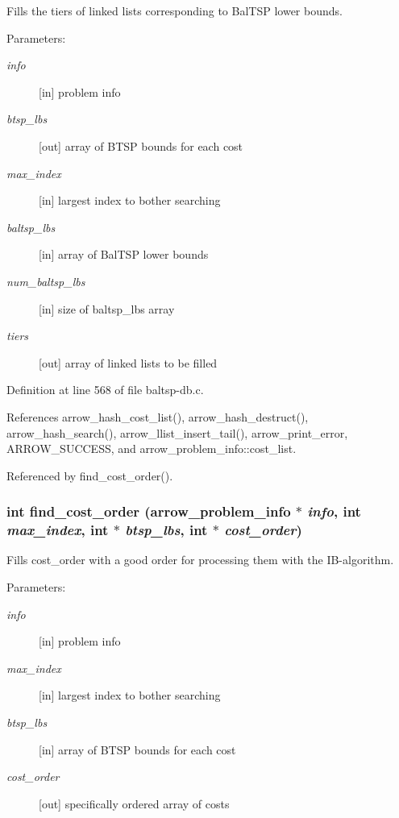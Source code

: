 Fills the tiers of linked lists corresponding to BalTSP lower bounds. 

\begin{Desc}
\item[Parameters:]
\begin{description}
\item[{\em info}]\mbox{[}in\mbox{]} problem info \item[{\em btsp\_\-lbs}]\mbox{[}out\mbox{]} array of BTSP bounds for each cost \item[{\em max\_\-index}]\mbox{[}in\mbox{]} largest index to bother searching \item[{\em baltsp\_\-lbs}]\mbox{[}in\mbox{]} array of BalTSP lower bounds \item[{\em num\_\-baltsp\_\-lbs}]\mbox{[}in\mbox{]} size of baltsp\_\-lbs array \item[{\em tiers}]\mbox{[}out\mbox{]} array of linked lists to be filled \end{description}
\end{Desc}


Definition at line 568 of file baltsp-db.c.

References arrow\_\-hash\_\-cost\_\-list(), arrow\_\-hash\_\-destruct(), arrow\_\-hash\_\-search(), arrow\_\-llist\_\-insert\_\-tail(), arrow\_\-print\_\-error, ARROW\_\-SUCCESS, and arrow\_\-problem\_\-info::cost\_\-list.

Referenced by find\_\-cost\_\-order().\hypertarget{lib_2baltsp_2baltsp-db_8c_fe2b4359a26c49fe7602c86021b91ee7}{
\subsubsection[{find\_\-cost\_\-order}]{\setlength{\rightskip}{0pt plus 5cm}int find\_\-cost\_\-order ({\bf arrow\_\-problem\_\-info} $\ast$ {\em info}, \/  int {\em max\_\-index}, \/  int $\ast$ {\em btsp\_\-lbs}, \/  int $\ast$ {\em cost\_\-order})}}
\label{lib_2baltsp_2baltsp-db_8c_fe2b4359a26c49fe7602c86021b91ee7}


Fills cost\_\-order with a good order for processing them with the IB-algorithm. 

\begin{Desc}
\item[Parameters:]
\begin{description}
\item[{\em info}]\mbox{[}in\mbox{]} problem info \item[{\em max\_\-index}]\mbox{[}in\mbox{]} largest index to bother searching \item[{\em btsp\_\-lbs}]\mbox{[}in\mbox{]} array of BTSP bounds for each cost \item[{\em cost\_\-order}]\mbox{[}out\mbox{]} specifically ordered array of costs \end{description}
\end{Desc}


